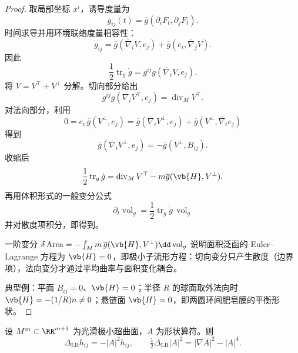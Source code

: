 \begin{proof}
取局部坐标 $x^i$，诱导度量为
\[
g_{ij}(t)
=\overline g(\partial_iF_t,\partial_jF_t).
\]
时间求导并用环境联络度量相容性：
\[
\dot g_{ij}
=\overline g(\overline\nabla_iV,e_j)
+\overline g(e_i,\overline\nabla_jV).
\]
因此
\[
\frac12\operatorname{tr}_g\dot g
=g^{ij}\overline g(\overline\nabla_iV,e_j).
\]
将 $V=V^\top+V^\perp$ 分解。切向部分给出
\[
g^{ij}g(\nabla_iV^\top,e_j)
=\operatorname{div}_M V^\top.
\]
对法向部分，利用
\[
0=e_i\,\overline g(V^\perp,e_j)
=\overline g(\overline\nabla_iV^\perp,e_j)
+\overline g(V^\perp,\overline\nabla_ie_j)
\]
得到
\[
\overline g(\overline\nabla_iV^\perp,e_j)
=-\overline g(V^\perp,B_{ij}).
\]
收缩后
\[
\frac12\operatorname{tr}_g\dot g
=\operatorname{div}_M V^\top
-m\overline g(\vb{H},V^\perp).
\]
再用体积形式的一般变分公式
\[
\partial_t\operatorname{vol}_g
=\frac12\operatorname{tr}_g\dot g\,\operatorname{vol}_g
\]
并对散度项积分，即得到。

一阶变分 $\delta\operatorname{Area}=-\int_M m\,\overline g(\vb{H},V^\perp)\dd\operatorname{vol}_g$ 说明面积泛函的 Euler--Lagrange 方程为 $\vb{H}=0$，即极小子流形方程：切向变分只产生散度（边界项），法向变分才通过平均曲率与面积变化耦合。

典型例：平面 $B_{ij}=0$、$\vb{H}=0$；半径 $R$ 的球面取外法向时 $\vb{H}=-(1/R)n\neq0$；悬链面 $\vb{H}=0$，即两圆环间肥皂膜的平衡形状。
\end{proof}

\begin{theorem}
设 $M^m\subset\RR^{m+1}$ 为光滑极小超曲面，$A$ 为形状算符。则\[\Delta_{\mathrm{LB}}h_{ij}=-|A|^2h_{ij},\qquad\tfrac12\Delta_{\mathrm{LB}}|A|^2=|\nabla A|^2-|A|^4.\]
\end{theorem}

